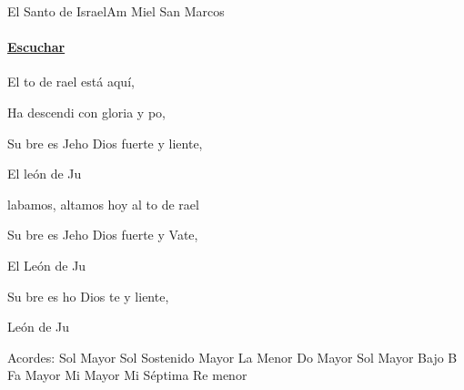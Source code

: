 \documentclass[12pt, spanish]{book}
\begin{document}
    \begin{song}{El Santo de Israel}{Am}
    {} %
    {Miel San Marcos}
    {} %
    {}
        \ifChordBk
            \paragraph{\mbox{}\hfill\protect\href{https://open.spotify.com/intl-es/track/2ugLJRJQWip01Kymf9XGgB}{Escuchar}\mbox{}\hfill}
        \fi


        \begin{SBOpGroup}
            El to de rael está aquí,

            Ha descendi con gloria y po,

            Su bre es Jeho Dios fuerte y liente,

            El león de Ju
        \end{SBOpGroup}

        \begin{SBChorus}
            labamos, altamos hoy al to de rael

            Su bre es Jeho Dios fuerte y Vate,

            El León de Ju
        \end{SBChorus}

        \begin{SBOpGroup}
             Su bre es ho   Dios te y liente,

              León de Ju
        \end{SBOpGroup}


        \ifChordBk
        \begin{SBOpGroup}
            Acordes:
            \upchord{\G}\qquad Sol Mayor \hfill
            \upchord{\Gs}\qquad Sol Sostenido Mayor \hfill\null\break
            \upchord{\Am}\qquad La Menor \hfill
            \upchord{\C}\qquad Do Mayor \hfill\null\break
            \upchord{\GB}\qquad Sol Mayor Bajo B \hfill
            \upchord{\F}\qquad Fa Mayor \hfill\null\break
            \upchord{\E}\qquad Mi Mayor \hfill
            \upchord{\Eseven}\qquad Mi S\'eptima \hfill
            \upchord{\Dm}\qquad Re menor \hfill\null\break
        \end{SBOpGroup}
        \fi
    \end{song}
\end{document}
